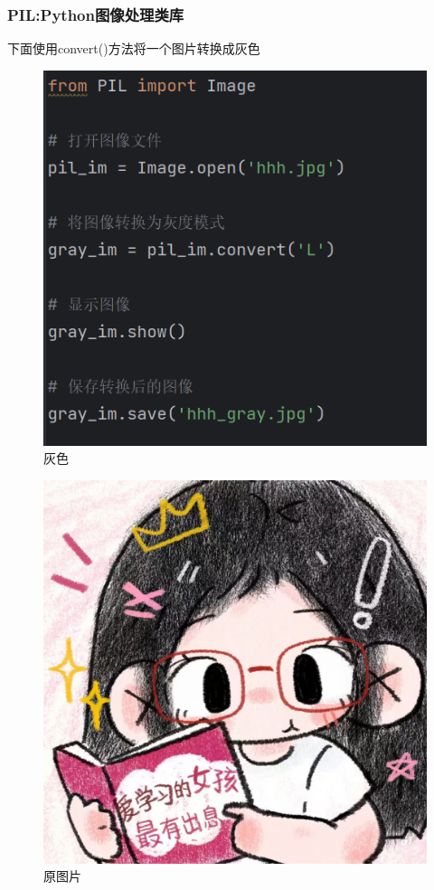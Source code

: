 \documentclass{ctexart}
\begin{document}
	\subsubsection{PIL:Python图像处理类库}
	下面使用convert()方法将一个图片转换成灰色
	\begin{figure}[H]
		\centering
		\includegraphics[scale=0.5]{3.83}
		\caption{灰色}
	\end{figure}
	
	\begin{figure}[H]
		\centering
		\includegraphics[scale=0.05]{3.81}
		\caption{原图片}
	\end{figure}
	
\end{document}
